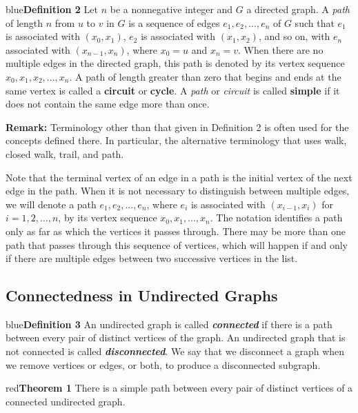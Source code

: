 \documentclass[11pt]{article}
\newenvironment{definition}[1]{\begin{mybox}{blue}{\textbf{Definition #1}}}{\end{mybox}}
\newenvironment{theorem}[1]{\begin{mybox}{red}{\textbf{Theorem #1}}}{\end{mybox}}
\begin{document}
\begin{definition}{2}
Let $n$ be a nonnegative integer and $G$ a directed graph. A \textit{path} of length $n$ from $u$ to $v$ in $G$ is a sequence of edges $e_1, e_2, ..., e_n$ of $G$ such that $e_1$ is associated with $(x_0, x_1)$, $e_2$ is associated with $(x_1, x_2)$, and so on, with $e_n$ associated with $(x_{n-1}, x_n)$, where $x_0 = u$ and $x_n = v$. When there are no multiple edges in the directed graph, this path is denoted by its vertex sequence $x_0, x_1, x_2, ..., x_n$. A path of length greater than zero that begins and ends at the same vertex is called a \textbf{circuit} or \textbf{cycle}. A \textit{path} or \textit{circuit} is called \textbf{simple} if it does not contain the same edge more than once.
\end{definition}

\noindent \textbf{Remark:} Terminology other than that given in Definition 2 is often used for the concepts defined there. In particular, the alternative terminology that uses walk, closed walk, trail, and path.

Note that the terminal vertex of an edge in a path is the initial vertex of the next edge in the path. When it is not necessary to distinguish between multiple edges, we will denote a path $e_1, e_2, ..., e_n$, where $e_i$ is associated with $(x_{i-1}, x_i)$ for $i = 1, 2, ..., n$, by its vertex sequence $x_0, x_1, ..., x_n$. The notation identifies a path only as far as which the vertices it passes through. There may be more than one path that passes through this sequence of vertices, which will happen if and only if there are multiple edges between two successive vertices in the list.

\subsection{Connectedness in Undirected Graphs}

\begin{definition}{3}
An undirected graph is called \textit{\textbf{connected}} if there is a path between every pair of distinct vertices of the graph. An undirected graph that is not connected is called \textit{\textbf{disconnected}}. We say that we disconnect a graph when we remove vertices or edges, or both, to produce a disconnected subgraph.
\end{definition}

\begin{theorem}{1}
There is a simple path between every pair of distinct vertices of a connected undirected graph.
\end{theorem}
\end{document}
